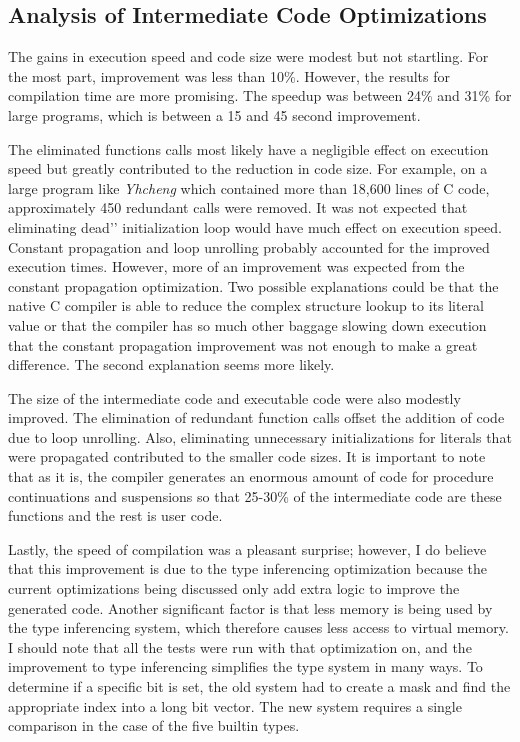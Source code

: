 \subsection{Analysis of Intermediate Code Optimizations}

The gains in execution speed and code size were modest but not
startling. For the most part, improvement was less than 10\%.
However, the results for compilation time are more promising. The
speedup was between 24\% and 31\% for large programs, which is between
a 15 and 45 second improvement.

The eliminated functions calls most likely have a negligible effect on
execution speed but greatly contributed to the reduction in code
size. For example, on a large program like \textit{Yhcheng} which
contained more than 18,600 lines of C code, approximately 450
redundant calls were removed. It was not expected that eliminating
{\textasciigrave}{\textasciigrave}dead'{}' initialization loop would
have much effect on execution speed. Constant propagation and loop
unrolling probably accounted for the improved execution
times. However, more of an improvement was expected from the constant
propagation optimization. Two possible explanations could be that the
native C compiler is able to reduce the complex structure lookup to
its literal value or that the compiler has so much other baggage
slowing down execution that the constant propagation improvement was
not enough to make a great difference. The second explanation seems
more likely.

The size of the intermediate code and executable code were also
modestly improved. The elimination of redundant function calls offset
the addition of code due to loop unrolling. Also, eliminating
unnecessary initializations for literals that were propagated
contributed to the smaller code sizes. It is important to note that as
it is, the compiler generates an enormous amount of code for procedure
continuations and suspensions so that 25-30\% of the intermediate code
are these functions and the rest is user code.

Lastly, the speed of compilation was a pleasant surprise; however, I
do believe that this improvement is due to the type inferencing
optimization because the current optimizations being discussed only
add extra logic to improve the generated code. Another significant
factor is that less memory is being used by the type inferencing
system, which therefore causes less access to virtual memory. I should
note that all the tests were run with that optimization on, and the
improvement to type inferencing simplifies the type system in many
ways. To determine if a specific bit is set, the old system had to
create a mask and find the appropriate index into a long bit
vector. The new system requires a single comparison in the case of the
five builtin types.


